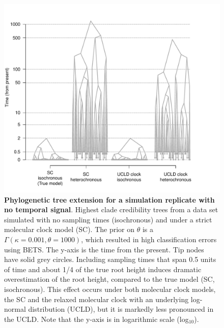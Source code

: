 \documentclass[10pt,letterpaper]{article}
\begin{document}
\begin{figure}[h!]
	\begin{center}
		\includegraphics[width=15cm]{sandbox_figures/tree_distortion_ultrametric.pdf}\newline
		\vspace{-0.5cm}
		\caption{\textbf{Phylogenetic tree extension for a simulation replicate with no temporal signal}. Highest clade credibility trees from a data set simulated with no sampling times (isochronous) and under a strict molecular clock model (SC). The prior on $\theta$ is a $\Gamma(\kappa=0.001, \theta=1000)$, which resulted in high classification errors using BETS. The y-axis is the time from the present. Tip nodes have solid grey circles. Including sampling times that span 0.5 units of time and about 1/4 of the true root height induces dramatic overestimation of the root height, compared to the true model (SC, isochronous). This effect  occurs under both molecular clock models, the SC and the relaxed molecular clock with an underlying log-normal distribution (UCLD), but it is markedly less pronounced in the UCLD. Note that the y-axis is in logarithmic scale (log$_{10}$).}
		\label{figure:ultrametric_tree_distortion}
	\end{center}
\end{figure}
\end{document}
